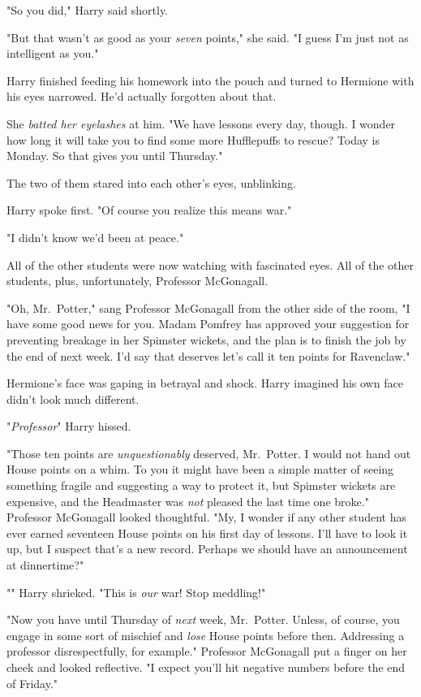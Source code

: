 "So you did," Harry said shortly.

"But that wasn't as good as your \emph{seven} points," she said. "I guess I'm
just not as intelligent as you."

Harry finished feeding his homework into the pouch and turned to Hermione with
his eyes narrowed. He'd actually forgotten about that.

She \emph{batted her eyelashes} at him. "We have lessons every day, though. I
wonder how long it will take you to find some more Hufflepuffs to rescue? Today
is Monday. So that gives you until Thursday."

The two of them stared into each other's eyes, unblinking.

Harry spoke first. "Of course you realize this means war."

"I didn't know we'd been at peace."

All of the other students were now watching with fascinated eyes. All of the
other students, plus, unfortunately, Professor McGonagall.

"Oh, Mr.~Potter," sang Professor McGonagall from the other side of the room, "I
have some good news for you. Madam Pomfrey has approved your suggestion for
preventing breakage in her Spimster wickets, and the plan is to finish the job
by the end of next week. I'd say that deserves{\el} let's call it ten points
for Ravenclaw."

Hermione's face was gaping in betrayal and shock. Harry imagined his own face
didn't look much different.

"\emph{Professor{\el}}" Harry hissed.

"Those ten points are \emph{unquestionably} deserved, Mr.~Potter. I would not
hand out House points on a whim. To you it might have been a simple matter of
seeing something fragile and suggesting a way to protect it, but Spimster
wickets are expensive, and the Headmaster was \emph{not} pleased the last time
one broke." Professor McGonagall looked thoughtful. "My, I wonder if any other
student has ever earned seventeen House points on his first day of lessons.
I'll have to look it up, but I suspect that's a new record. Perhaps we should
have an announcement at dinnertime?"

"\emph{}" Harry shrieked. "This is \emph{our} war! Stop meddling!"

"Now you have until Thursday of \emph{next} week, Mr.~Potter. Unless, of
course, you engage in some sort of mischief and \emph{lose} House points before
then. Addressing a professor disrespectfully, for example." Professor
McGonagall put a finger on her cheek and looked reflective. "I expect you'll
hit negative numbers before the end of Friday."

